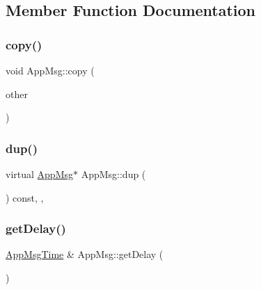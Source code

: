 \subsection{Member Function Documentation}
\mbox{\label{class_app_msg_a2d5c5dacc13f5e7959467693cd0beda9}} 
\subsubsection{\texorpdfstring{copy()}{copy()}}
{\footnotesize\ttfamily void App\+Msg\+::copy (\begin{DoxyParamCaption}\item[{const \hyperlink{class_app_msg}{App\+Msg} \&}]{other }\end{DoxyParamCaption})\hspace{0.3cm}{\ttfamily [private]}}

\mbox{\label{class_app_msg_ab4d1256f22c1ee48aec128e558a03940}} 
\subsubsection{\texorpdfstring{dup()}{dup()}}
{\footnotesize\ttfamily virtual \hyperlink{class_app_msg}{App\+Msg}$\ast$ App\+Msg\+::dup (\begin{DoxyParamCaption}{ }\end{DoxyParamCaption}) const\hspace{0.3cm}{\ttfamily [inline]}, {\ttfamily [override]}, {\ttfamily [virtual]}}

\mbox{\label{class_app_msg_aa45e97cdd014921d271665e856c642cc}} 
\subsubsection{\texorpdfstring{get\+Delay()}{getDelay()}\hspace{0.1cm}{\footnotesize\ttfamily [1/2]}}
{\footnotesize\ttfamily \hyperlink{_app_msg__m_8h_afd955b091e7d9b98cff80a090db1eb09}{App\+Msg\+Time} \& App\+Msg\+::get\+Delay (\begin{DoxyParamCaption}{ }\end{DoxyParamCaption})\hspace{0.3cm}{\ttfamily [virtual]}}

